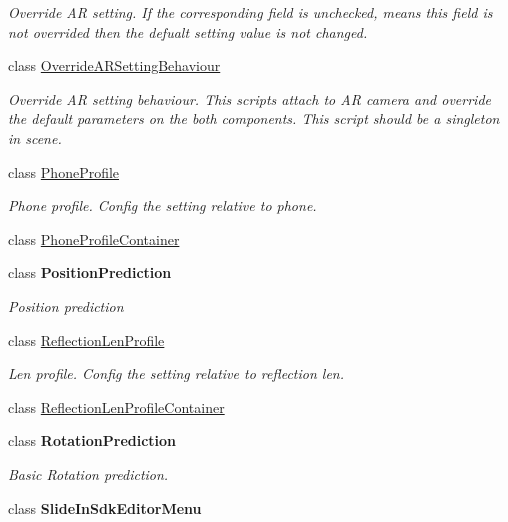 \begin{DoxyCompactItemize}
\begin{DoxyCompactList}\small\item\em Override AR setting. If the corresponding field is unchecked, means this field is not overrided then the defualt setting value is not changed. \end{DoxyCompactList}\item 
class \mbox{\hyperlink{class_ximmerse_1_1_slide_in_s_d_k_1_1_override_a_r_setting_behaviour}{Override\+A\+R\+Setting\+Behaviour}}
\begin{DoxyCompactList}\small\item\em Override AR setting behaviour. This scripts attach to AR camera and override the default parameters on the both components. This script should be a singleton in scene. \end{DoxyCompactList}\item 
class \mbox{\hyperlink{class_ximmerse_1_1_slide_in_s_d_k_1_1_phone_profile}{Phone\+Profile}}
\begin{DoxyCompactList}\small\item\em Phone profile. Config the setting relative to phone. \end{DoxyCompactList}\item 
class \mbox{\hyperlink{class_ximmerse_1_1_slide_in_s_d_k_1_1_phone_profile_container}{Phone\+Profile\+Container}}
\item 
class {\bfseries Position\+Prediction}
\begin{DoxyCompactList}\small\item\em Position prediction \end{DoxyCompactList}\item 
class \mbox{\hyperlink{class_ximmerse_1_1_slide_in_s_d_k_1_1_reflection_len_profile}{Reflection\+Len\+Profile}}
\begin{DoxyCompactList}\small\item\em Len profile. Config the setting relative to reflection len. \end{DoxyCompactList}\item 
class \mbox{\hyperlink{class_ximmerse_1_1_slide_in_s_d_k_1_1_reflection_len_profile_container}{Reflection\+Len\+Profile\+Container}}
\item 
class {\bfseries Rotation\+Prediction}
\begin{DoxyCompactList}\small\item\em Basic Rotation prediction. \end{DoxyCompactList}\item 
class {\bfseries Slide\+In\+Sdk\+Editor\+Menu}

\end{DoxyCompactItemize}
